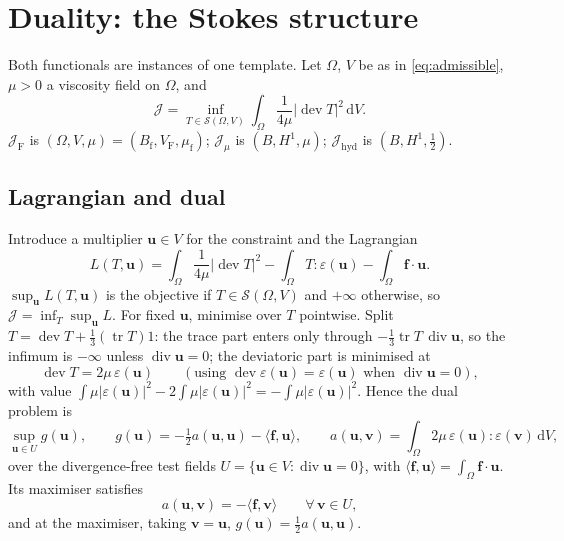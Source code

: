 \documentclass[11pt]{article}
\newcommand{\Jf}{\mathscr{J}}  %
\newcommand{\eps}{\varepsilon}
\newcommand{\Bf}{B_{\mathrm{f}}}
\newcommand{\bu}{\mathbf{u}}
\newcommand{\bv}{\mathbf{v}}
\newcommand{\bff}{\mathbf{f}}
\newcommand{\dV}{\,\mathrm{d}V}
\newcommand{\tr}{\operatorname{tr}}
\newcommand{\dev}{\operatorname{dev}}
\renewcommand{\div}{\operatorname{div}}
\newcommand{\ip}[2]{\langle #1, #2\rangle}
\newcommand{\JF}{\Jf _{\mathrm{F}}}
\newcommand{\Jmu}{\Jf _{\mu}}
\newcommand{\Jh}{\Jf _{\mathrm{hyd}}}
\begin{document}
\section{Duality: the Stokes structure}
\label{sec:dual}

Both functionals are instances of one template. Let $\Omega$, $V$ be as
in \eqref{eq:admissible}, $\mu > 0$ a viscosity field on $\Omega$, and
\begin{equation}
  \Jf  = \inf_{T \in \mathcal{S}(\Omega, V)} \int_\Omega \frac{1}{4\mu}|\dev T|^2\dV .
  \label{eq:template}
\end{equation}
$\JF$ is $(\Omega, V, \mu) = (\Bf, V_{\mathrm{F}}, \mu_{\mathrm{f}})$;
$\Jmu$ is $(B, H^1, \mu)$; $\Jh$ is $(B, H^1, \tfrac12)$.

\subsection{Lagrangian and dual}

Introduce a multiplier $\bu \in V$ for the constraint and the Lagrangian
\begin{equation}
  L(T, \bu) = \int_\Omega \frac{1}{4\mu}|\dev T|^2
  - \int_\Omega T : \eps(\bu) - \int_\Omega \bff\cdot\bu .
\end{equation}
$\sup_{\bu} L(T,\bu)$ is the objective if $T \in \mathcal{S}(\Omega,V)$
and $+\infty$ otherwise, so $\Jf  = \inf_T\sup_{\bu}L$. For fixed $\bu$,
minimise over $T$ pointwise. Split $T = \dev T + \tfrac13(\tr T)1$:
the trace part enters only through $-\tfrac13\tr T\,\div\bu$, so the
infimum is $-\infty$ unless $\div\bu = 0$; the deviatoric part is
minimised at
\begin{equation}
  \dev T = 2\mu\,\eps(\bu)
  \qquad(\text{using } \dev\eps(\bu) = \eps(\bu) \text{ when } \div\bu = 0),
  \label{eq:devT}
\end{equation}
with value $\int\mu|\eps(\bu)|^2 - 2\int\mu|\eps(\bu)|^2 =
-\int\mu|\eps(\bu)|^2$. Hence the dual problem is
\begin{equation}
  \sup_{\bu \in U} g(\bu), \qquad
  g(\bu) = -\tfrac12 a(\bu,\bu) - \ip{\bff}{\bu}, \qquad
  a(\bu,\bv) = \int_\Omega 2\mu\,\eps(\bu):\eps(\bv)\dV,
  \label{eq:dual}
\end{equation}
over the divergence-free test fields $U = \{\bu \in V : \div\bu = 0\}$,
with $\ip{\bff}{\bu} = \int_\Omega\bff\cdot\bu$. Its maximiser satisfies
\begin{equation}
  a(\bu,\bv) = -\ip{\bff}{\bv} \qquad \forall\,\bv \in U ,
  \label{eq:stokes-weak}
\end{equation}
and at the maximiser, taking $\bv = \bu$, $g(\bu) = \tfrac12 a(\bu,\bu)$.
\end{document}
